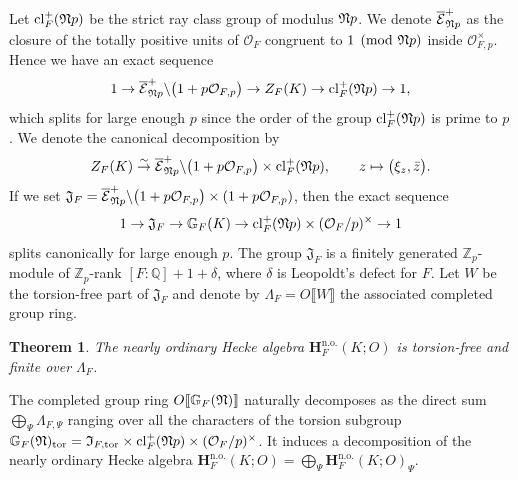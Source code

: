 \documentclass[10pt]{amsart}
\numberwithin{equation}{section}
\newtheorem{thm}{Theorem}[section]
\theoremstyle{definition}
\theoremstyle{remark} %
\newcommand{\bb}{\mathbb}
\newcommand{\mbf}{\mathbf}
\newcommand{\mrm}{\mathrm}
\begin{document}
	
	
	
	\noindent Let $\mrm{cl}_F^+(\frak{N}p)$ be the strict ray class group of modulus $\frak{N}p$. We denote $\overline{\mathcal{E}}^+_{\frak{N}p}$ as the closure of the totally positive units of $\mathcal{O}_F$ congruent to $1\pmod{\frak{N}p}$ inside $\mathcal{O}_{F,p}^\times$. Hence we have an exact sequence
	$$	1 \rightarrow \overline{\mathcal{E}}^+_{\frak{N}p}\backslash\big(1+p\mathcal{O}_{F,p}\big) \rightarrow Z_F(K) \rightarrow \mrm{cl}_F^+(\frak{N}p) \rightarrow 1,	$$
	which splits for large enough $p$ since the order of the group $\mrm{cl}_F^+(\frak{N}p)$ is prime to $p$. We denote the canonical decomposition by
	\begin{equation}\label{GaloisDecomposition}
		Z_F(K) \overset{\sim}{\to} \overline{\mathcal{E}}^+_{\frak{N}p}\backslash\big(1+p\mathcal{O}_{F,p}\big) \times \mrm{cl}_F^+(\frak{N}p),\qquad z\mapsto \big(\xi_z,\bar{z}\big).	
	\end{equation} 
	If we set
	$\mathfrak{J}_F = \overline{\mathcal{E}}^+_{\frak{N}p}\backslash\big(1+p\mathcal{O}_{F,p}\big) \times (1+p \mathcal{O}_{F,p})$, then the exact sequence
	$$ 1 \rightarrow \mathfrak{J}_F \rightarrow \bb{G}_F(K) \rightarrow \mrm{cl}_F^+(\frak{N}p)\times (\mathcal{O}_F/p)^\times \rightarrow 1 $$	
	splits canonically for large enough $p$. The group $\mathfrak{J}_F$ is a finitely generated $\bb{Z}_p$-module of $\bb{Z}_p$-rank $[F:\bb{Q}]+1+\delta$, where $\delta$ is Leopoldt's defect for $F$. Let $W$ be the torsion-free part of $\mathfrak{J}_F$ and denote by
	$\Lambda_F = O\llbracket W \rrbracket$ the associated completed group ring.
	
	
	
	\begin{thm}\cite[Theorem 2.4]{hida89nearly}
		The nearly ordinary Hecke algebra $\mathbf{H}_F^{\mrm{n.o.}}(K;O)$ is torsion-free and finite over $\Lambda_F$.
	\end{thm}
	
	
	
	
	
	\noindent The completed group ring $O\llbracket\bb{G}_F(\frak{N})\rrbracket$ naturally decomposes as the direct sum $\bigoplus_\Psi \Lambda_{F,\Psi}$ ranging over all the characters of the torsion subgroup
	$\bb{G}_F(\frak{N})_\mrm{tor} = \mathfrak{I}_{F,\mrm{tor}}\times \mrm{cl}_F^+(\frak{N}p)\times (\mathcal{O}_F/p)^\times$.
	It induces a decomposition of the nearly ordinary Hecke algebra $
	\mbf{H}_F^{\mrm{n.o.}}(K;O) = \bigoplus_{\Psi}\mathbf{H}_F^{\mrm{n.o.}}(K;O)_\Psi$.
	
\end{document}
